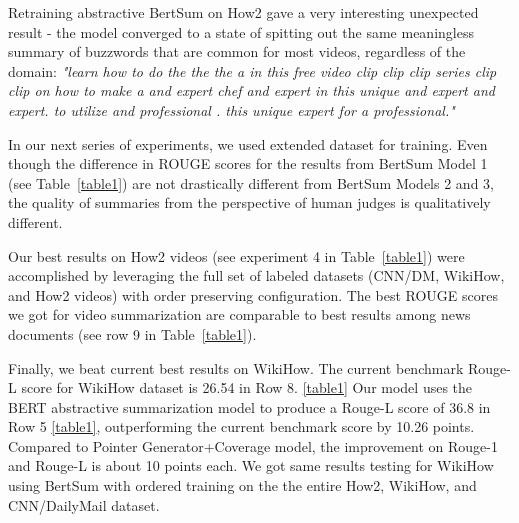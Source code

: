 \documentclass[sigconf]{acmart}
\begin{document}
Retraining abstractive BertSum on How2 gave a very interesting unexpected result - the model converged to a state of spitting out the same meaningless summary of buzzwords that are common for most videos, regardless of the domain: \emph{"learn how to do the the the a in this free video clip clip clip series clip clip on how to make a and expert chef and expert in this unique and expert and expert. to utilize and professional . this unique expert for a professional."}

In our next series of experiments, we used extended dataset for training.  Even though the difference in ROUGE scores for the results from BertSum Model 1 (see Table~\ref{table1}) are not drastically different from  BertSum Models 2 and 3, the quality of summaries from the perspective of human judges is qualitatively different.

Our best results on How2 videos (see experiment 4 in Table~\ref{table1}) were accomplished by leveraging the full set of labeled datasets (CNN/DM, WikiHow, and How2 videos) with order preserving configuration. The best ROUGE scores we got for video summarization are comparable to best results among news documents \cite{liu-lapata-2019-text} (see row 9 in Table~\ref{table1}).

Finally, we beat current best results on WikiHow. The current benchmark Rouge-L score for WikiHow dataset is 26.54 in Row 8. \ref{table1} Our model uses the BERT abstractive summarization model to produce a Rouge-L score of 36.8 in Row 5 \ref{table1}, outperforming the current benchmark score by 10.26 points. Compared to  Pointer Generator+Coverage model, the improvement on Rouge-1 and Rouge-L is about 10 points each. We got same results testing for WikiHow using BertSum with ordered training on the the entire How2, WikiHow, and CNN/DailyMail dataset.
\end{document}
